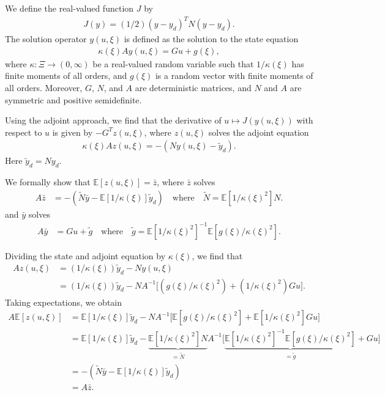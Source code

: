 \documentclass{article}
\newcommand{\cE}[1]{\mathbb{E}[#1]}
\newcommand{\pobj}{J}
\begin{document}
We define the real-valued function $\pobj$ by
\begin{align*}
	\pobj(y) = 
	(1/2)(y-y_d)^T N (y-y_d).
\end{align*}
The solution operator $y(u,\xi)$ 
is defined as the solution to
the state equation
\begin{align*}
	\kappa(\xi) A y(u,\xi) = Gu + g(\xi),
\end{align*}
where 
$\kappa : \Xi \to (0,\infty)$ be a real-valued random variable
such that $1/\kappa(\xi)$ has finite moments of all orders, 
and $g(\xi)$ is a random vector with finite moments
of all orders.
Moreover, $G$, $N$, and $A$ are deterministic matrices, and
$N$ and $A$ are symmetric and positive semidefinite.


Using the adjoint approach, we find that
the derivative of $u \mapsto \pobj(y(u,\xi))$
with respect to $u$ is given by
$-G^Tz(u,\xi)$, where $z(u,\xi)$ solves
the adjoint equation
\begin{align*}
	\kappa(\xi) A z(u,\xi) = - (Ny(u,\xi)-\widetilde{y}_d).
\end{align*}
Here $\widetilde{y}_d = Ny_d$.


We formally show that $\cE{z(u,\xi)} = \bar{z}$, 
where $\bar{z}$ solves
\begin{align*}
	A \bar{z} &
	= - (\widetilde{N}\bar{y} - \cE{1/\kappa(\xi)}\widetilde{y}_d)
	\quad 
	\text{where}
	\quad 
	\widetilde{N} = \cE{1/\kappa(\xi)^2} N. 
\end{align*}
and $\bar{y}$ solves
\begin{align*}
	A \bar{y}
	&= G u + \widetilde{g}
	\quad \text{where}
	\quad \widetilde{g}
	= \cE{1/\kappa(\xi)^2}^{-1} \cE{g(\xi)/\kappa(\xi)^2}.
\end{align*}


Dividing the state and adjoint equation by $\kappa(\xi)$, we find that
\begin{align*}
	A z(u,\xi) 
	& =  (1/\kappa(\xi)) \widetilde{y}_d  - Ny(u,\xi) \\
	& =  (1/\kappa(\xi)) \widetilde{y}_d 
	- N A^{-1}\Big[(g(\xi)/\kappa(\xi)^2)+
	(1/\kappa(\xi)^2)G u\Big]. 
\end{align*}
Taking expectations, we obtain 
\begin{align*}
	A \cE{z(u,\xi)}
	& =\cE{1/\kappa(\xi)} \widetilde{y}_d  
	- N A^{-1}\Big[\cE{g(\xi)/\kappa(\xi)^2}+
	\cE{1/\kappa(\xi)^2}Gu\Big] \\
	& =\cE{1/\kappa(\xi)} \widetilde{y}_d  
	- \underbrace{\cE{1/\kappa(\xi)^2} N}_{=\widetilde{N}} 
	A^{-1} \Big[
	\underbrace{\cE{1/\kappa(\xi)^2}^{-1}
		\cE{g(\xi)/\kappa(\xi)^2}}_{=\widetilde{g}}+
	Gu\Big] \\
	& = - (\widetilde{N}\bar{y} - \cE{1/\kappa(\xi)}\widetilde{y}_d)
	\\
	& = A \bar{z}.
\end{align*}
\end{document}
